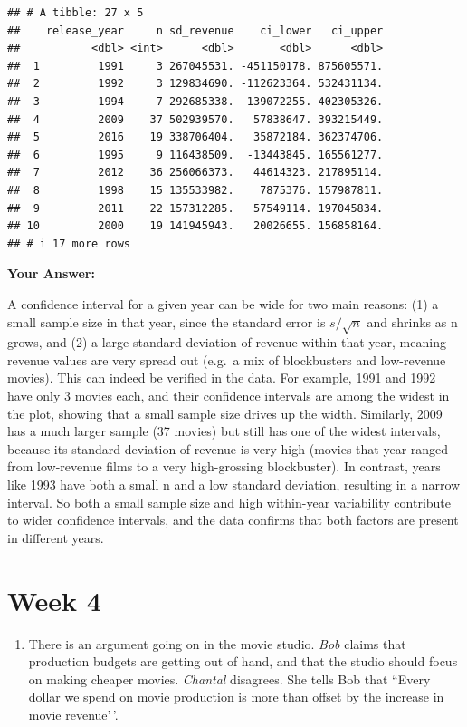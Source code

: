 \documentclass[
]{article}
\providecommand{\tightlist}{%
  \setlength{\itemsep}{0pt}\setlength{\parskip}{0pt}}
\begin{document}
\begin{verbatim}
## # A tibble: 27 x 5
##    release_year     n sd_revenue    ci_lower   ci_upper
##           <dbl> <int>      <dbl>       <dbl>      <dbl>
##  1         1991     3 267045531. -451150178. 875605571.
##  2         1992     3 129834690. -112623364. 532431134.
##  3         1994     7 292685338. -139072255. 402305326.
##  4         2009    37 502939570.   57838647. 393215449.
##  5         2016    19 338706404.   35872184. 362374706.
##  6         1995     9 116438509.  -13443845. 165561277.
##  7         2012    36 256066373.   44614323. 217895114.
##  8         1998    15 135533982.    7875376. 157987811.
##  9         2011    22 157312285.   57549114. 197045834.
## 10         2000    19 141945943.   20026655. 156858164.
## # i 17 more rows
\end{verbatim}

\textbf{Your Answer:}

A confidence interval for a given year can be wide for two main reasons:
(1) a small sample size in that year, since the standard error is
\(s/\sqrt{n}\) and shrinks as n grows, and (2) a large standard
deviation of revenue within that year, meaning revenue values are very
spread out (e.g.~a mix of blockbusters and low-revenue movies). This can
indeed be verified in the data. For example, 1991 and 1992 have only 3
movies each, and their confidence intervals are among the widest in the
plot, showing that a small sample size drives up the width. Similarly,
2009 has a much larger sample (37 movies) but still has one of the
widest intervals, because its standard deviation of revenue is very high
(movies that year ranged from low-revenue films to a very high-grossing
blockbuster). In contrast, years like 1993 have both a small n and a low
standard deviation, resulting in a narrow interval. So both a small
sample size and high within-year variability contribute to wider
confidence intervals, and the data confirms that both factors are
present in different years.

\section{Week 4}\label{week-4}

\begin{enumerate}
\def\labelenumi{\arabic{enumi}.}
\tightlist
\item
  There is an argument going on in the movie studio. \emph{Bob} claims
  that production budgets are getting out of hand, and that the studio
  should focus on making cheaper movies. \emph{Chantal} disagrees. She
  tells Bob that ``Every dollar we spend on movie production is more
  than offset by the increase in movie revenue'\,'.
\end{enumerate}
\end{document}
